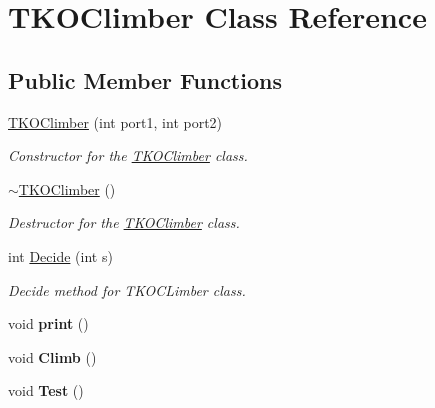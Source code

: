\hypertarget{classTKOClimber}{\section{\-T\-K\-O\-Climber \-Class \-Reference}
\label{classTKOClimber}
}
\subsection*{\-Public \-Member \-Functions}
\begin{DoxyCompactItemize}
\item 
\hyperlink{classTKOClimber_a82d438cb98eb650983acce7b16139dca}{\-T\-K\-O\-Climber} (int port1, int port2)
\begin{DoxyCompactList}\small\item\em \-Constructor for the \hyperlink{classTKOClimber}{\-T\-K\-O\-Climber} class. \end{DoxyCompactList}\item 
\hypertarget{classTKOClimber_a104b22e1e6ad8cf60614963ab1b73c2a}{\hyperlink{classTKOClimber_a104b22e1e6ad8cf60614963ab1b73c2a}{$\sim$\-T\-K\-O\-Climber} ()}\label{classTKOClimber_a104b22e1e6ad8cf60614963ab1b73c2a}

\begin{DoxyCompactList}\small\item\em \-Destructor for the \hyperlink{classTKOClimber}{\-T\-K\-O\-Climber} class. \end{DoxyCompactList}\item 
int \hyperlink{classTKOClimber_a86a910c6e9cc08b308383507eee6d02b}{\-Decide} (int s)
\begin{DoxyCompactList}\small\item\em \-Decide method for \-T\-K\-O\-C\-Limber class. \end{DoxyCompactList}\item 
\hypertarget{classTKOClimber_a288a7ae811b66832c8ef7cc8d9ff605f}{void {\bfseries print} ()}\label{classTKOClimber_a288a7ae811b66832c8ef7cc8d9ff605f}

\item 
\hypertarget{classTKOClimber_a4aceaf8b04aa9652dff701ceb1b8f28d}{void {\bfseries \-Climb} ()}\label{classTKOClimber_a4aceaf8b04aa9652dff701ceb1b8f28d}

\item 
\hypertarget{classTKOClimber_a73c9efc5056027a3fe06bbb141587446}{void {\bfseries \-Test} ()}\label{classTKOClimber_a73c9efc5056027a3fe06bbb141587446}


\end{DoxyCompactItemize}
